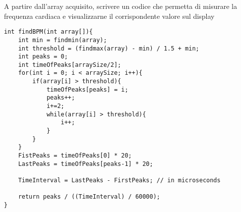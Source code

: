 A partire dall’array acquisito, scrivere un codice che permetta di misurare la frequenza cardiaca e visualizzarne il corrispondente valore sul display
\begin{lstlisting}[frame=single, language=Arduino]
int findBPM(int array[]){
    int min = findmin(array);
    int threshold = (findmax(array) - min) / 1.5 + min;
    int peaks = 0;
    int timeOfPeaks[arraySize/2];
    for(int i = 0; i < arraySize; i++){
        if(array[i] > threshold){
            timeOfPeaks[peaks] = i;
            peaks++;
            i+=2;
            while(array[i] > threshold){
                i++;
            }
        }
    }
    FistPeaks = timeOfPeaks[0] * 20;
    LastPeaks = timeOfPeaks[peaks-1] * 20;

    TimeInterval = LastPeaks - FirstPeaks; // in microseconds
    
    return peaks / ((TimeInterval) / 60000);
}
\end{lstlisting}